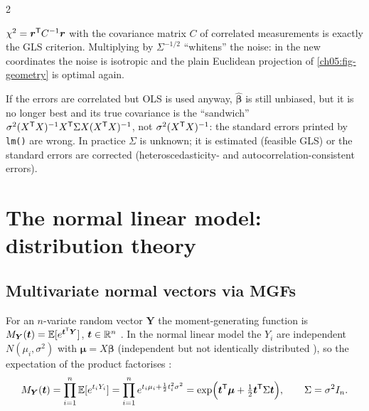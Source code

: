 \begin{paracol}{2}
\begin{intuition}[Whitening]
$\chi^2=\bm r^{\mathsf T} C^{-1}\bm r$ with the covariance matrix $C$ of correlated measurements is exactly the GLS criterion.
Multiplying by $\Sigma^{-1/2}$ ``whitens'' the noise: in the new coordinates the noise is isotropic and the plain
Euclidean projection of \cref{ch05:fig-geometry} is optimal again.
\end{intuition}

\begin{remark}
If the errors are correlated but OLS is used anyway, $\hat{\bm\beta}$ is still unbiased, but it is no longer best and its
true covariance is the ``sandwich'' $\sigma^2(X^{\mathsf T} X)^{-1}X^{\mathsf T}\Sigma X(X^{\mathsf T} X)^{-1}$, not $\sigma^2(X^{\mathsf T} X)^{-1}$: the standard
errors printed by \texttt{lm()} are wrong. In practice $\Sigma$ is unknown; it is estimated (feasible GLS) or the
standard errors are corrected (heteroscedasticity- and autocorrelation-consistent errors).
\end{remark}

\section{The normal linear model: distribution theory}\label{ch05:sec-normal}

\subsection{Multivariate normal vectors via MGFs}
For an $n$-variate random vector $\bm Y$ the moment-generating function is $M_{\bm Y}(\bm t)=\mathbb{E}[e^{\bm t^{\mathsf T}\bm Y}]$,
$\bm t\in\mathbb{R}^n$ . In the normal linear model the $Y_i$ are independent $N(\mu_i,\sigma^2)$ with
$\bm\mu=X\bm\beta$ (independent but not identically distributed ), so the expectation of the product
factorises  :
\[
  M_{\bm Y}(\bm t)=\prod_{i=1}^n\mathbb{E}[e^{t_iY_i}]=\prod_{i=1}^ne^{t_i\mu_i+\frac12t_i^2\sigma^2}
  =\exp\Bigl(\bm t^{\mathsf T}\bm\mu+\tfrac12\bm t^{\mathsf T}\Sigma\bm t\Bigr),\qquad \Sigma=\sigma^2I_n .
\]


\end{paracol}
